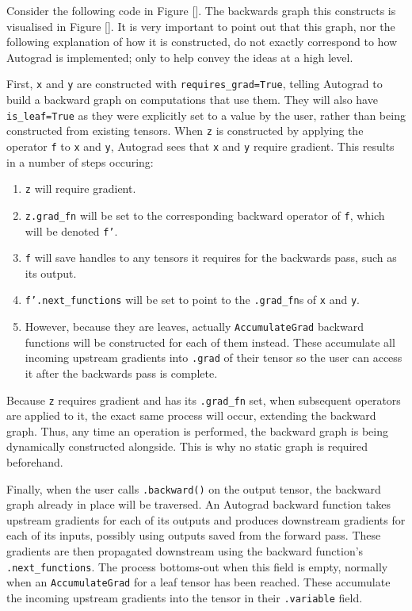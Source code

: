 Consider the following code in Figure [].
The backwards graph this constructs is visualised in Figure [].
It is very important to point out that this graph, nor the following explanation of how it is constructed, do not exactly correspond to how Autograd is implemented; only to help convey the ideas at a high level.

First, \texttt{x} and \texttt{y} are constructed with \texttt{requires\_grad=True}, telling Autograd to build a backward graph on computations that use them.
They will also have \texttt{is\_leaf=True} as they were explicitly set to a value by the user, rather than being constructed from existing tensors.
When \texttt{z} is constructed by applying the operator \texttt{f} to \texttt{x} and \texttt{y}, Autograd sees that \texttt{x} and \texttt{y} require gradient.
This results in a number of steps occuring:
\begin{enumerate}[topsep=0.1em]
    \item \texttt{z} will require gradient.
    \item \texttt{z.grad\_fn} will be set to the corresponding backward operator of \texttt{f}, which will be denoted \texttt{f'}.
    \item \texttt{f} will save handles to any tensors it requires for the backwards pass, such as its output.
    \item \texttt{f'.next\_functions} will be set to point to the \texttt{.grad\_fn}s of \texttt{x} and \texttt{y}.
    \item However, because they are leaves, actually \texttt{AccumulateGrad} backward functions will be constructed for each of them instead.
    These accumulate all incoming upstream gradients into \texttt{.grad} of their tensor so the user can access it after the backwards pass is complete.
\end{enumerate}
Because \texttt{z} requires gradient and has its \texttt{.grad\_fn} set, when subsequent operators are applied to it, the exact same process will occur, extending the backward graph.
Thus, any time an operation is performed, the backward graph is being dynamically constructed alongside.
This is why no static graph is required beforehand.

Finally, when the user calls \texttt{.backward()} on the output tensor, the backward graph already in place will be traversed.
An Autograd backward function takes upstream gradients for each of its outputs and produces downstream gradients for each of its inputs, possibly using outputs saved from the forward pass.
These gradients are then propagated downstream using the backward function's \texttt{.next\_functions}.
The process bottoms-out when this field is empty, normally when an \texttt{AccumulateGrad} for a leaf tensor has been reached.
These accumulate the incoming upstream gradients into the tensor in their \texttt{.variable} field.

